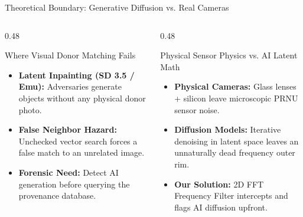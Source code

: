 \documentclass[aspectratio=169,xcolor=table,10pt]{beamer}
\begin{document}
\begin{frame}{Theoretical Boundary: Generative Diffusion vs. Real Cameras}
  \begin{columns}[T]
    \begin{column}{0.48\textwidth}
      \begin{alertblock}{Where Visual Donor Matching Fails}
        \small
        \begin{itemize}
          \item \textbf{Latent Inpainting (SD 3.5 / Emu):} Adversaries generate objects without any physical donor photo.
          \item \textbf{False Neighbor Hazard:} Unchecked vector search forces a false match to an unrelated image.
          \item \textbf{Forensic Need:} Detect AI generation before querying the provenance database.
        \end{itemize}
      \end{alertblock}
    \end{column}

    \begin{column}{0.48\textwidth}
      \begin{block}{Physical Sensor Physics vs. AI Latent Math}
        \small
        \begin{itemize}
          \item \textbf{Physical Cameras:} Glass lenses + silicon leave microscopic PRNU sensor noise.
          \item \textbf{Diffusion Models:} Iterative denoising in latent space leaves an unnaturally dead frequency outer rim.
          \item \textbf{Our Solution:} 2D FFT Frequency Filter intercepts and flags AI diffusion upfront.
        \end{itemize}
      \end{block}
    \end{column}
  \end{columns}
\end{frame}
\end{document}
